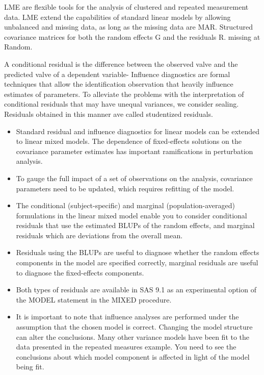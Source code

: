 \documentclass[12pt, a4paper]{report}
\theoremstyle{plain}
\theoremstyle{definition}
\theoremstyle{remark}
\begin{document}
LME are flexible tools for the analysis of clustered and repeated measurement data. LME extend the capabilities of standard linear models by allowing unbalanced and missing data, as long as the missing data are MAR. Structured covariance matrices for both the random effects G and the residuals R. missing at Random.

A conditional residual is the difference between the observed valve and the predicted valve of a dependent variable- Influence diagnostics are formal techniques that allow the identification observation that heavily influence estimates of parameters.
To alleviate the problems with the interpretation of conditional residuals that may have unequal variances, we consider sealing.
Residuals obtained in this manner ave called studentized residuals.

\begin{itemize}
	\item Standard residual and inﬂuence diagnostics for linear models can be extended to linear mixed models. The dependence of ﬁxed-effects solutions on the covariance parameter estimates has important ramiﬁcations in perturbation analysis. 
	\item To gauge the full impact of a set of observations on the analysis, covariance parameters need to be updated, which requires reﬁtting of the model. 
	
	\item The conditional (subject-speciﬁc) and marginal (population-averaged) formulations in the linear mixed model enable you to consider conditional residuals that use the estimated BLUPs of the random effects, and marginal residuals which are deviations from the overall mean. 
	\item Residuals using the BLUPs are useful to diagnose whether the random effects components in the model are speciﬁed correctly, marginal residuals are useful to diagnose the ﬁxed-effects components. 
	\item Both types of residuals are available in SAS 9.1 as an experimental option of the MODEL statement in the MIXED procedure.
	
	\item It is important to note that influence analyses are performed under the assumption that the chosen model is correct. Changing the model structure can alter the conclusions. Many other variance models have been ﬁt to the data presented in the repeated measures example. You need to see the conclusions about which model component is affected in light of the model being fit.
\end{itemize}










\printindex


\end{document}
